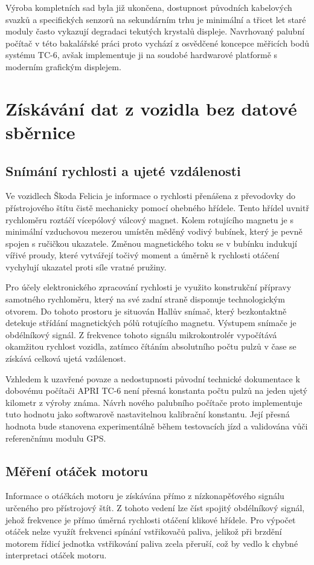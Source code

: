 Výroba kompletních sad byla již ukončena, dostupnost původních kabelových svazků a specifických senzorů na sekundárním trhu je minimální a třicet 
let staré moduly často vykazují degradaci tekutých krystalů displeje. 
Navrhovaný palubní počítač v této bakalářské práci proto vychází z osvědčené koncepce měřicích bodů systému TC-6, 
avšak implementuje ji na soudobé hardwarové platformě s moderním grafickým displejem.

\chapter{Získávání dat z vozidla bez datové sběrnice}

\section{Snímání rychlosti a ujeté vzdálenosti}
Ve vozidlech Škoda Felicia je informace o rychlosti přenášena z převodovky do přístrojového štítu čistě mechanicky pomocí ohebného hřídele. 
Tento hřídel uvnitř rychloměru roztáčí vícepólový válcový magnet. Kolem rotujícího magnetu je s minimální vzduchovou mezerou umístěn měděný vodivý bubínek, 
který je pevně spojen s ručičkou ukazatele. Změnou magnetického toku se v bubínku indukují vířivé proudy, 
které vytvářejí točivý moment a úměrně k rychlosti otáčení vychylují ukazatel proti síle vratné pružiny.

Pro účely elektronického zpracování rychlosti je využito konstrukční přípravy samotného rychloměru, 
který na své zadní straně disponuje technologickým otvorem. Do tohoto prostoru je situován Hallův snímač, 
který bezkontaktně detekuje střídání magnetických pólů rotujícího magnetu. Výstupem snímače je obdélníkový signál. 
Z frekvence tohoto signálu mikrokontrolér vypočítává okamžitou rychlost vozidla, zatímco čítáním absolutního počtu pulzů v čase se získává celková ujetá vzdálenost.

Vzhledem k uzavřené povaze a nedostupnosti původní technické dokumentace k dobovému počítači APRI TC-6 není přesná konstanta počtu pulzů na jeden ujetý kilometr z výroby známa. 
Návrh nového palubního počítače proto implementuje tuto hodnotu jako softwarově nastavitelnou kalibrační konstantu. 
Její přesná hodnota bude stanovena experimentálně během testovacích jízd a validována vůči referenčnímu modulu GPS.

\section{Měření otáček motoru}
Informace o otáčkách motoru je získávána přímo z nízkonapěťového signálu určeného pro přístrojový štít.
Z tohoto vedení lze číst spojitý obdélníkový signál, jehož frekvence je přímo úměrná rychlosti otáčení klikové hřídele. 
Pro výpočet otáček nelze využít frekvenci spínání vstřikovačů paliva, jelikož při brzdění motorem
řídicí jednotka vstřikování paliva zcela přeruší, což by vedlo k chybné interpretaci otáček motoru.

